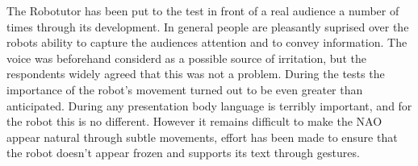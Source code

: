 The Robotutor has been put to the test in front of a real audience a number of times through its development. In general people are pleasantly suprised over the robots ability to capture the audiences attention and to convey information. The voice was beforehand considerd as a possible source of irritation, but the respondents widely agreed that this was not a problem. During the tests the importance of the robot's movement turned out to be even greater than anticipated. During any presentation body language is terribly important, and for the robot this is no different. However it remains difficult to make the NAO appear natural through subtle movements, effort has been made to ensure that the robot doesn't appear frozen and supports its text through gestures.